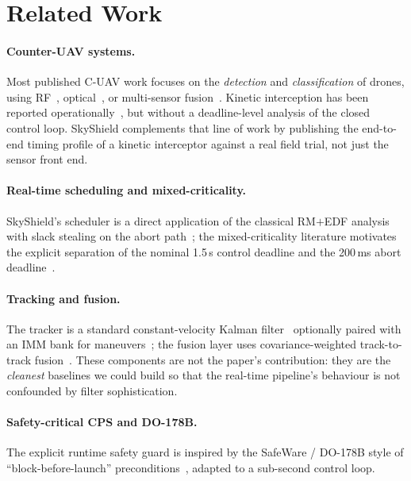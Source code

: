\documentclass[conference]{IEEEtran}
\begin{document}
\section{Related Work}
\paragraph{Counter-UAV systems.}
Most published C-UAV work focuses on the \emph{detection} and
\emph{classification} of drones, using RF~\cite{nguyen2021drone,
bisio2018unmanned}, optical~\cite{taha2019machine}, or multi-sensor
fusion~\cite{samaras2019deep,hsu2021counter,guerra2021drone}.  Kinetic
interception has been reported operationally~\cite{usaf2017cuas,
kratky2017countering}, but without a deadline-level analysis of the closed
control loop.  SkyShield complements that line of work by publishing the
end-to-end timing profile of a kinetic interceptor against a real field
trial, not just the sensor front end.

\paragraph{Real-time scheduling and mixed-criticality.}
SkyShield's scheduler is a direct application of the classical RM$+$EDF
analysis~\cite{liu1973scheduling,leung1982complexity,audsley1993applying}
with slack stealing on the abort path~\cite{lehoczky1987enhanced,
buttazzo2011hard,sha1990priority}; the mixed-criticality literature
motivates the explicit separation of the nominal 1.5\,s control deadline and
the 200\,ms abort deadline~\cite{vestal2007preemptive,baruah2011response,
burns2017mixed,baruah2011cyclic,koren1996skip,jensen1985time}.

\paragraph{Tracking and fusion.}
The tracker is a standard constant-velocity Kalman filter~\cite{
kalman1960new} optionally paired with an IMM bank for
maneuvers~\cite{blom1988interacting,barshalom2001estimation}; the fusion
layer uses covariance-weighted track-to-track fusion~\cite{chang1997optimal,
lavine1999feedback}.  These components are not the paper's contribution:
they are the \emph{cleanest} baselines we could build so that the
real-time pipeline's behaviour is not confounded by filter sophistication.

\paragraph{Safety-critical CPS and DO-178B.}
The explicit runtime safety guard is inspired by the SafeWare / DO-178B
style of ``block-before-launch'' preconditions~\cite{leveson1995safeware,
knight2002safety,arpspec1999do178,kopetz2011real,lee2003cyber}, adapted to
a sub-second control loop.
\end{document}
